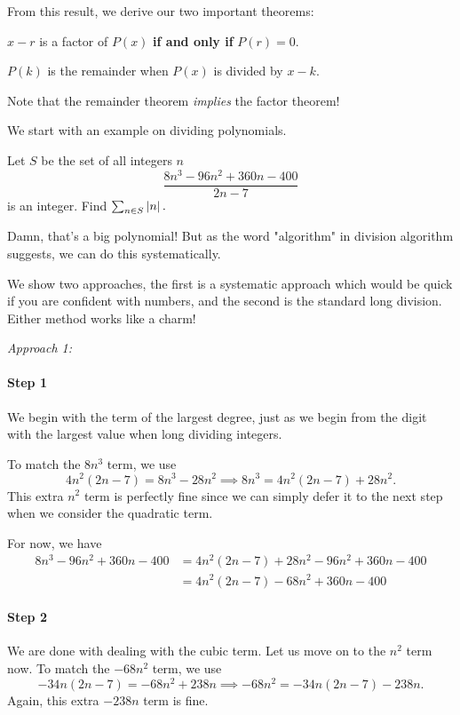 \documentclass[../jarvis.tex]{subfiles}
\begin{document}
From this result, we derive our two important theorems:
\begin{theorem}
    $x-r$ is a factor of $P(x)$ \textbf{if and only if} $P(r)=0$.
\end{theorem}
\begin{theorem}
    $P(k)$ is the remainder when $P(x)$ is divided by $x-k$. 
\end{theorem}
\begin{remark}
    Note that the remainder theorem \textit{implies} the factor theorem!
\end{remark}

We start with an example on dividing polynomials.
\begin{example}[2011 SMO(O) P1]
    Let $S$ be the set of all integers $n$ $$\frac{8n^3-96n^2+360n-400}{2n-7}$$ is an integer. Find $\sum_{n\in S}\left\lvert n \right\rvert.$
\end{example}
Damn, that's a big polynomial! But as the word "algorithm" in division algorithm suggests, we can do this systematically. 

We show two approaches, the first is a systematic approach which would be quick if you are confident with numbers, and the second is the standard long division. Either method works like a charm!

\textit{Approach 1:}
\paragraph{Step 1}We begin with the term of the largest degree, just as we begin from the digit with the largest value when long dividing integers.

To match the $8n^3$ term, we use $$4n^2(2n-7)=8n^3-28n^2\implies 8n^3=4n^2(2n-7)+28n^2.$$ This extra $n^2$ term is perfectly fine since we can simply defer it to the next step when we consider the quadratic term.

For now, we have 
\begin{align*}
    8n^3-96n^2+360n-400&=4n^2(2n-7)+28n^2-96n^2+360n-400 \\
    &=4n^2(2n-7)-68n^2+360n-400
\end{align*}

\paragraph{Step 2}We are done with dealing with the cubic term. Let us move on to the $n^2$ term now. To match the $-68n^2$ term, we use $$-34n(2n-7)=-68n^2+238n \implies -68n^2=-34n(2n-7)-238n.$$ Again, this extra $-238n$ term is fine.
\end{document}

